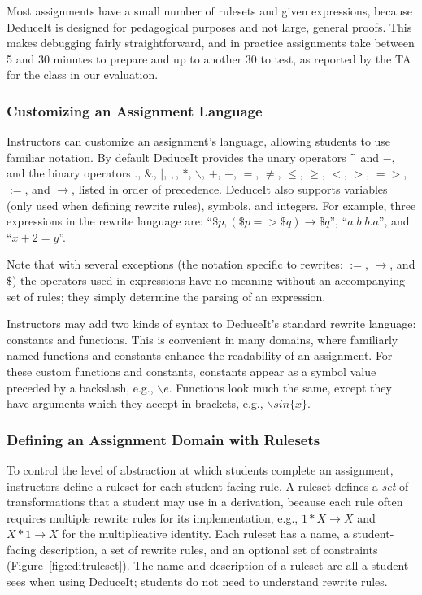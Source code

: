 \documentclass{sigchi}
\begin{document}
Most assignments have a small number of rulesets and given expressions, because DeduceIt is designed for pedagogical purposes and not large, general proofs. This makes debugging fairly straightforward, and in practice assignments take between 5 and 30 minutes to prepare and up to another 30 to test, as reported by the TA for the class in our evaluation.

\subsubsection{Customizing an Assignment Language}

Instructors can customize an assignment's language, allowing students to use familiar notation. By default DeduceIt provides the unary operators $\char`\~$ and $-$, and the binary operators $.$, $\&$, $|$, $,$, $*$, $\backslash$, $+$, $-$, $=$, $\neq$, $\leq$, $\geq$, $<$, $>$, $=>$, $:=$, and $\rightarrow$, listed in order of precedence. DeduceIt also supports variables (only used when defining rewrite rules), symbols, and integers. For example, three expressions in the rewrite language are: ``$\$p,(\$p=>\$q)\rightarrow{}\$q$'', ``$a.b.b.a$'', and ``$x+2=y$''.

Note that with several exceptions (the notation specific to rewrites: $:=$, $\rightarrow$, and $\$$) the operators used in expressions have no meaning without an accompanying set of rules; they simply determine the parsing of an expression.

Instructors may add two kinds of syntax to DeduceIt's standard rewrite language: constants and functions. This is convenient in many domains, where familiarly named functions and constants enhance the readability of an assignment. For these custom functions and constants, constants appear as a symbol value preceded by a backslash, e.g., $\backslash{}e$. Functions look much the same, except they have arguments which they accept in brackets, e.g., $\backslash{}sin\{x\}$.

\subsubsection{Defining an Assignment Domain with Rulesets}

To control the level of abstraction at which students complete an assignment, instructors define a ruleset for each student-facing rule. A ruleset defines a \textit{set} of transformations that a student may use in a derivation, because each rule often requires multiple rewrite rules for its implementation, e.g., $1*X \rightarrow X$ and $X*1 \rightarrow X$ for the multiplicative identity. Each ruleset has a name, a student-facing description, a set of rewrite rules, and an optional set of constraints (Figure~\ref{fig:editruleset}). The name and description of a ruleset are all a student sees when using DeduceIt; students do not need to understand rewrite rules.
\end{document}
